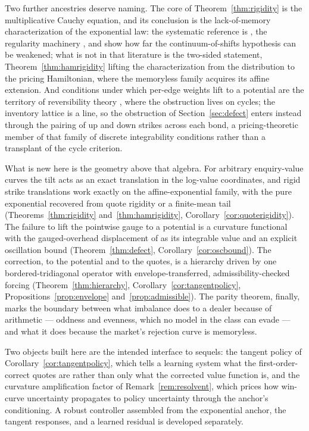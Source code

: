 \documentclass[11pt]{article}
\begin{document}
Two further ancestries deserve naming. The core of Theorem~\ref{thm:rigidity} is the multiplicative Cauchy equation, and its conclusion is the lack-of-memory characterization of the exponential law: the systematic reference is \citet{galamboskotz1978}, the regularity machinery \citet{aczel1966}, and \citet{marsagliatubilla1975} show how far the continuum-of-shifts hypothesis can be weakened; what is not in that literature is the two-sided statement, Theorem~\ref{thm:hamrigidity} lifting the characterization from the distribution to the pricing Hamiltonian, where the memoryless family acquires its affine extension. And conditions under which per-edge weights lift to a potential are the territory of reversibility theory \citep{kelly1979}, where the obstruction lives on cycles; the inventory lattice is a line, so the obstruction of Section~\ref{sec:defect} enters instead through the pairing of up and down strikes across each bond, a pricing-theoretic member of that family of discrete integrability conditions rather than a transplant of the cycle criterion.

What is new here is the geometry above that algebra. For arbitrary enquiry-value curves the tilt acts as an exact translation in the log-value coordinates, and rigid strike translations work exactly on the affine-exponential family, with the pure exponential recovered from quote rigidity or a finite-mean tail (Theorems~\ref{thm:rigidity} and~\ref{thm:hamrigidity}, Corollary~\ref{cor:quoterigidity}). The failure to lift the pointwise gauge to a potential is a curvature functional with the gauged-overhead displacement of \citet{cotton2026skew} as its integrable value and an explicit oscillation bound (Theorem~\ref{thm:defect}, Corollary~\ref{cor:oscbound}). The correction, to the potential and to the quotes, is a hierarchy driven by one bordered-tridiagonal operator with envelope-transferred, admissibility-checked forcing (Theorem~\ref{thm:hierarchy}, Corollary~\ref{cor:tangentpolicy}, Propositions~\ref{prop:envelope} and~\ref{prop:admissible}). The parity theorem, finally, marks the boundary between what imbalance does to a dealer because of arithmetic --- oddness and evenness, which no model in the class can evade --- and what it does because the market's rejection curve is memoryless.

Two objects built here are the intended interface to sequels: the tangent policy of Corollary~\ref{cor:tangentpolicy}, which tells a learning system what the first-order-correct quotes are rather than only what the corrected value function is, and the curvature amplification factor of Remark~\ref{rem:resolvent}, which prices how win-curve uncertainty propagates to policy uncertainty through the anchor's conditioning. A robust controller assembled from the exponential anchor, the tangent responses, and a learned residual is developed separately.
\end{document}
